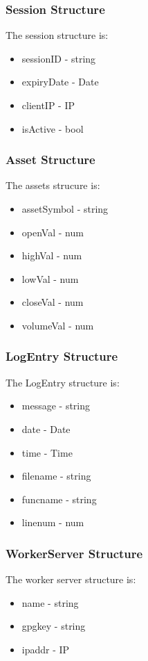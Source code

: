 \documentclass[a4paper]{article}
\begin{document}
\subsubsection{Session Structure}
\label{ds_session}
The session structure is:
\begin{itemize}
	\item sessionID - string
	\item expiryDate - Date
	\item clientIP - IP
	\item isActive - bool
\end{itemize}

\subsubsection{Asset Structure}
\label{ds_asset}
The assets strucure is:
\begin{itemize}
	\item assetSymbol - string
	\item openVal - num
	\item highVal - num
	\item lowVal - num
	\item closeVal - num
	\item volumeVal - num
\end{itemize}

\subsubsection{LogEntry Structure}
\label{ds_logentry}
The LogEntry structure is:
\begin{itemize}
	\item message - string
	\item date - Date
	\item time - Time
	\item filename - string
	\item funcname - string
	\item linenum - num
\end{itemize}

\subsubsection{WorkerServer Structure}
\label{ds_workerserver}
The worker server structure is:
\begin{itemize}
	\item name - string
	\item gpgkey - string
	\item ipaddr - IP
\end{itemize}
\end{document}
